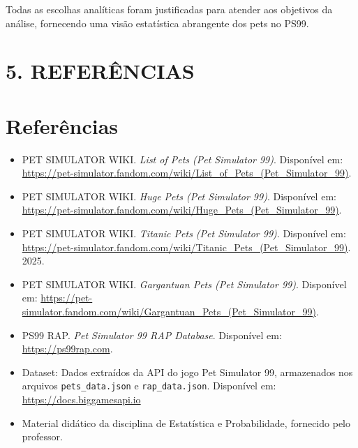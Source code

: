 \documentclass[12pt]{article}
\begin{document}
Todas as escolhas analíticas foram justificadas para atender aos objetivos da análise, fornecendo uma visão estatística abrangente dos pets no PS99.

\section*{5. REFERÊNCIAS}
\section*{Referências}

\begin{itemize}
  \item PET SIMULATOR WIKI. \textit{List of Pets (Pet Simulator 99)}. Disponível em: \url{https://pet-simulator.fandom.com/wiki/List_of_Pets_(Pet_Simulator_99)}. 

  \item PET SIMULATOR WIKI. \textit{Huge Pets (Pet Simulator 99)}. Disponível em: \url{https://pet-simulator.fandom.com/wiki/Huge_Pets_(Pet_Simulator_99)}. 

  \item PET SIMULATOR WIKI. \textit{Titanic Pets (Pet Simulator 99)}. Disponível em: \url{https://pet-simulator.fandom.com/wiki/Titanic_Pets_(Pet_Simulator_99)}.  2025.

  \item PET SIMULATOR WIKI. \textit{Gargantuan Pets (Pet Simulator 99)}. Disponível em: \url{https://pet-simulator.fandom.com/wiki/Gargantuan_Pets_(Pet_Simulator_99)}.

  \item PS99 RAP. \textit{Pet Simulator 99 RAP Database}. Disponível em: \url{https://ps99rap.com}. 

  \item Dataset: Dados extraídos da API do jogo Pet Simulator 99, armazenados nos arquivos \texttt{pets\_data.json} e \texttt{rap\_data.json}. Disponível em:
  \url{https://docs.biggamesapi.io}

  \item Material didático da disciplina de Estatística e Probabilidade, fornecido pelo professor.
\end{itemize}
\end{document}
